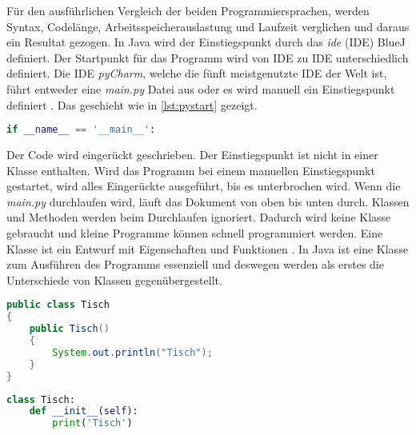 Für den ausführlichen Vergleich der beiden Programmiersprachen, werden Syntax, Codelänge, Arbeitsspeicherauslastung und Laufzeit verglichen und daraus ein Resultat gezogen.
In Java wird der Einstiegspunkt durch das \textit{\acrlong{ide}} (IDE) BlueJ definiert. Der Startpunkt für das Programm wird von IDE zu IDE unterschiedlich definiert. Die IDE \textit{pyCharm}, welche die fünft meistgenutzte IDE der Welt ist, führt entweder eine \textit{main.py} Datei aus oder es wird manuell ein Einstiegspunkt definiert \cite{Github:IDE}. Das geschieht wie in \ref{lst:pystart} gezeigt.

\begin{lstlisting}[language=python,caption={Einstiegspunkt Python},captionpos=b,label={lst:pystart},frame=none]
if __name__ == '__main__':
\end{lstlisting}

Der Code wird eingerückt geschrieben. Der Einstiegspunkt ist nicht in einer Klasse enthalten. Wird das Programm bei einem manuellen Einstiegspunkt gestartet, wird alles Eingerückte ausgeführt, bis es unterbrochen wird. Wenn die \textit{main.py} durchlaufen wird, läuft das Dokument von oben bis unten durch. Klassen und Methoden werden beim Durchlaufen ignoriert. Dadurch wird keine Klasse gebraucht und kleine Programme können schnell programmiert werden. Eine Klasse ist ein Entwurf mit Eigenschaften und Funktionen \cite{gfg}. In Java ist eine Klasse zum Ausführen des Programms essenziell und deswegen werden als erstes die Unterschiede von Klassen gegenübergestellt.

\begin{lstlisting}[language=java,caption={Klasse in Java},captionpos=b,label={lst:java:class},frame=none]
public class Tisch
{
    public Tisch()
    {
        System.out.println("Tisch");
    }
}
\end{lstlisting}

\begin{lstlisting}[language=python,caption={Klasse in Python},captionpos=b,label={lst:python:class},frame=none]
class Tisch:
    def __init__(self):
        print('Tisch')
\end{lstlisting}

